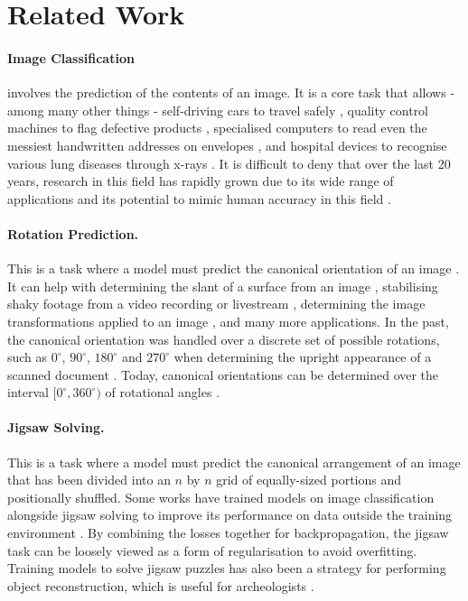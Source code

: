 \documentclass{article}
\begin{document}
\section{Related Work}
\paragraph{Image Classification} involves the prediction of the contents of an image. It is a core task that allows - among many other things - self-driving cars to travel safely \cite{du2019self, kulkarni2018traffic, kuehnle1998winter}, quality control machines to flag defective products \cite{kunkel2020quality}, specialised computers to read even the messiest handwritten addresses on envelopes \cite{gilloux1993research}, and hospital devices to recognise various lung diseases through x-rays \cite{abbas2021classification, wang2017chestx}. It is difficult to deny that over the last 20 years, research in this field has rapidly grown due to its wide range of applications and its potential to mimic human accuracy in this field \cite{singh2020image}.

\paragraph{Rotation Prediction.} This is a task where a model must predict the canonical orientation of an image \cite{8932427}. It can help with determining the slant of a surface from an image \cite{413886}, stabilising shaky footage from a video recording or livestream \cite{fischer2015image}, determining the image transformations applied to an image \cite{gidaris2018unsupervised}, and many more applications. In the past, the canonical orientation was handled over a discrete set of possible rotations, such as $0^\circ$, $90^\circ$, $180^\circ$ and $270^\circ$ when determining the upright appearance of a scanned document \cite{fischer2015image}. Today, canonical orientations can be determined over the interval $[0^\circ, 360^\circ)$ of rotational angles \cite{fischer2015image, 8932427}.

\paragraph{Jigsaw Solving.} This is a task where a model must predict the canonical arrangement of an image that has been divided into an $n$ by $n$ grid of equally-sized portions and positionally shuffled. Some works have trained models on image classification alongside jigsaw solving to improve its performance on data outside the training environment \cite{noroozi2016unsupervised}. By combining the losses together for backpropagation, the jigsaw task can be loosely viewed as a form of regularisation to avoid overfitting. Training models to solve jigsaw puzzles has also been a strategy for performing object reconstruction, which is useful for archeologists \cite{8451094}.
\end{document}
